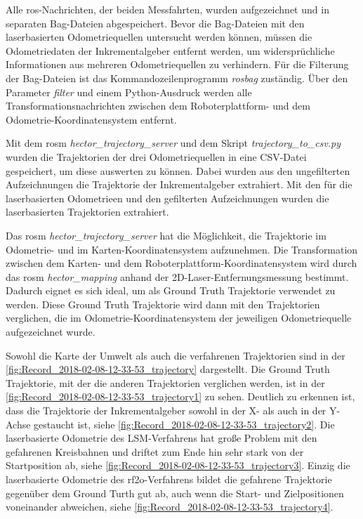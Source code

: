 Alle \gls{ros}-Nachrichten, der beiden Messfahrten, wurden aufgezeichnet und in separaten Bag-Dateien abgespeichert. Bevor die Bag-Dateien mit den laserbasierten Odometriequellen untersucht werden können, müssen die Odometriedaten der Inkrementalgeber entfernt werden, um widersprüchliche Informationen aus mehreren Odometriequellen zu verhindern. Für die Filterung der Bag-Dateien ist das Kommandozeilenprogramm \textit{rosbag} zuständig. Über den Parameter \textit{filter} und einem Python-Ausdruck werden alle Transformationsnachrichten zwischen dem Roboterplattform- und dem Odometrie-Koordinatensystem entfernt.

Mit dem \gls{rosm} \textit{hector\_trajectory\_server} und dem Skript \textit{trajectory\_to\_csv.py} wurden die Trajektorien der drei Odometriequellen in eine CSV-Datei gespeichert, um diese auswerten zu können. Dabei wurden aus den ungefilterten Aufzeichnungen die Trajektorie der Inkrementalgeber extrahiert. Mit den  für die laserbasierten Odometrieen und den gefilterten Aufzeichnungen wurden die laserbasierten Trajektorien extrahiert.

Das \gls{rosm} \textit{hector\_trajectory\_server} hat die Möglichkeit, die Trajektorie im Odometrie- und im Karten-Koordinatensystem aufzunehmen. Die Transformation zwischen dem Karten- und dem Roboterplattform-Koordinatensystem wird durch das \gls{rosm} \textit{hector\_mapping} anhand der 2D-Laser-Entfernungsmessung bestimmt. Dadurch eignet es sich ideal, um als Ground Truth Trajektorie verwendet zu werden. Diese Ground Truth Trajektorie wird dann mit den Trajektorien verglichen, die im Odometrie-Koordinatensystem der jeweiligen Odometriequelle aufgezeichnet wurde.


Sowohl die Karte der Umwelt als auch die verfahrenen Trajektorien sind in der \autoref{fig:Record_2018-02-08-12-33-53_trajectory} dargestellt. Die Ground Truth Trajektorie, mit der die anderen Trajektorien verglichen werden, ist in der \autoref{fig:Record_2018-02-08-12-33-53_trajectory1} zu sehen. Deutlich zu erkennen ist, dass die Trajektorie der Inkrementalgeber sowohl in der X- als auch in der Y-Achse gestaucht ist, siehe \autoref{fig:Record_2018-02-08-12-33-53_trajectory2}. Die laserbasierte Odometrie des LSM-Verfahrens hat große Problem mit den gefahrenen Kreisbahnen und driftet zum Ende hin sehr stark von der Startposition ab, siehe \autoref{fig:Record_2018-02-08-12-33-53_trajectory3}. Einzig die laserbasierte Odometrie des \gls{rf2o}-Verfahrens bildet die gefahrene Trajektorie gegenüber dem Ground Turth gut ab, auch wenn die Start- und Zielpositionen voneinander abweichen, siehe \autoref{fig:Record_2018-02-08-12-33-53_trajectory4}.

